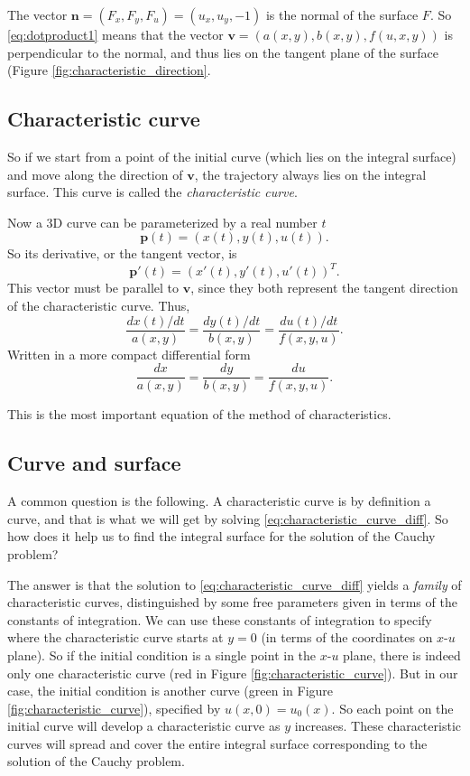 \documentclass{article}
\begin{document}
The vector $\mathbf n = (F_x, F_y, F_u) = (u_x, u_y, -1)$
is the normal of the surface $F$.
So \eqref{eq:dotproduct1}
means that the vector $\mathbf v = (a(x, y), b(x, y), f(u, x, y))$
is perpendicular to the normal,
and thus lies on the tangent plane of the surface
(Figure \ref{fig:characteristic_direction}.



\subsection{Characteristic curve}

So if we start from a point of the initial curve
(which lies on the integral surface)
and move along the direction of $\mathbf v$,
the trajectory always lies on the integral surface.
%
This curve is called the \emph{characteristic curve}.

Now a 3D curve can be parameterized by a real number $t$
$$
\mathbf p(t) = (x(t), y(t), u(t)).
$$
So its derivative, or the tangent vector, is
$$
\mathbf p'(t) = (x'(t), y'(t), u'(t))^T.
$$
This vector must be parallel to $\mathbf v$,
since they both represent the tangent direction of the characteristic curve.
Thus,
$$
\frac{ dx(t)/dt } { a(x, y) }
=
\frac{ dy(t)/dt } { b(x, y) }
=
\frac{ du(t)/dt } { f(x, y, u) }.
$$
Written in a more compact differential form
\begin{equation}
\frac{ dx } { a(x, y) }
=
\frac{ dy } { b(x, y) }
=
\frac{ du } { f(x, y, u) }.
\label{eq:characteristic_curve_diff}
\end{equation}

This is the most important equation
of the method of characteristics.


\subsection{Curve and surface}

A common question is the following.
A characteristic curve is by definition a curve,
and that is what we will get by solving
\eqref{eq:characteristic_curve_diff}.
%
So how does it help us to find the integral surface
for the solution of the Cauchy problem?

The answer is that the solution to
\eqref{eq:characteristic_curve_diff}
yields a \emph{family} of characteristic curves,
distinguished by some free parameters
given in terms of the constants of integration.
%
We can use these constants of integration
to specify where the characteristic curve starts
at $y = 0$ (in terms of the coordinates on $x$-$u$ plane).
%
So if the initial condition is a single point
in the $x$-$u$ plane,
there is indeed only one characteristic curve
(red in Figure \ref{fig:characteristic_curve}).
%
But in our case, the initial condition is another curve
(green in Figure \ref{fig:characteristic_curve}),
specified by $u(x, 0) = u_0(x)$.
%
So each point on the initial curve will develop a characteristic curve
as $y$ increases.
%
These characteristic curves will spread and cover
the entire integral surface
corresponding to the solution of the Cauchy problem.
\end{document}
